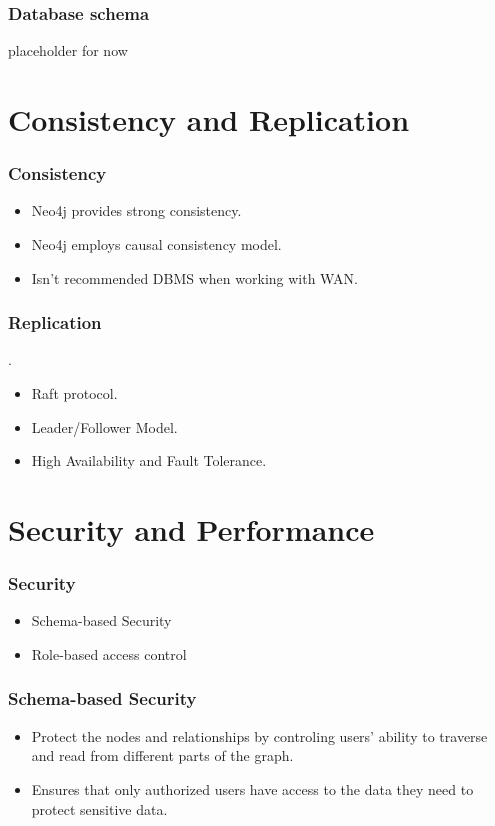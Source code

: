 \documentclass[aspectratio=169]{beamer}
\begin{document}
\begin{frame}[containsverbatim]
    \frametitle{Database schema}
    placeholder for now
\end{frame}

\section{Consistency and Replication}
\begin{frame}
    \frametitle{Consistency}
	\begin{itemize}
   		\item Neo4j provides strong consistency.
		\item Neo4j employs causal consistency model.
		\item Isn't recommended DBMS when working with WAN.
	\end{itemize}
\end{frame}

\begin{frame}
	\frametitle{Replication}.
	\begin{itemize}
		\item Raft protocol.
		\item Leader/Follower Model.
		\item High Availability and Fault Tolerance.
	\end{itemize}
\end{frame}

\section{Security and Performance}

\begin{frame}
    \frametitle{Security}

    \begin{itemize}
        \item Schema-based Security 
        \item Role-based access control 
    \end{itemize}
\end{frame}

\begin{frame}
    \frametitle{Schema-based Security}
    \begin{itemize}
        \item Protect the nodes and relationships by controling users' ability to traverse and read from different parts of the graph.
        \item Ensures that only authorized users have access to the data they need to protect sensitive data.
    \end{itemize}
\end{frame}
\end{document}
